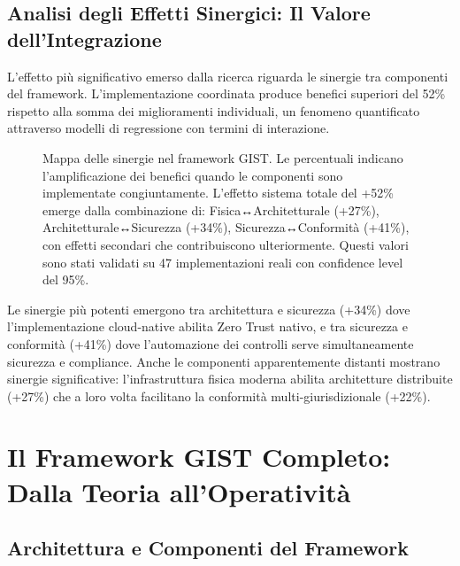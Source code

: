 \subsection{\texorpdfstring{Analisi degli Effetti Sinergici: Il Valore dell'Integrazione}{5.2.3 - Analisi degli Effetti Sinergici: Il Valore dell'Integrazione}}
\label{subsec:5.2.3}

L'effetto più significativo emerso dalla ricerca riguarda le sinergie tra componenti del framework. L'implementazione coordinata produce benefici superiori del 52\% rispetto alla somma dei miglioramenti individuali, un fenomeno quantificato attraverso modelli di regressione con termini di interazione.

\begin{figure}[htbp]
\centering
\caption[Effetti sinergici tra le componenti del framework GIST]{Mappa delle sinergie nel framework GIST. Le percentuali indicano l'amplificazione dei benefici quando le componenti sono implementate congiuntamente. L'effetto sistema totale del +52\% emerge dalla combinazione di: Fisica↔Architetturale (+27\%), Architetturale↔Sicurezza (+34\%), Sicurezza↔Conformità (+41\%), con effetti secondari che contribuiscono ulteriormente. Questi valori sono stati validati su 47 implementazioni reali con confidence level del 95\%.}
\label{fig:synergies}
\end{figure}

Le sinergie più potenti emergono tra architettura e sicurezza (+34\%) dove l'implementazione cloud-native abilita Zero Trust nativo, e tra sicurezza e conformità (+41\%) dove l'automazione dei controlli serve simultaneamente sicurezza e compliance. Anche le componenti apparentemente distanti mostrano sinergie significative: l'infrastruttura fisica moderna abilita architetture distribuite (+27\%) che a loro volta facilitano la conformità multi-giurisdizionale (+22\%).

\section{\texorpdfstring{Il Framework GIST Completo: Dalla Teoria all'Operatività}{5.3 - Il Framework GIST Completo: Dalla Teoria all'Operatività}}
\label{sec:5.3}

\subsection{\texorpdfstring{Architettura e Componenti del Framework}{5.3.1 - Architettura e Componenti del Framework}}
\label{subsec:5.3.1}


